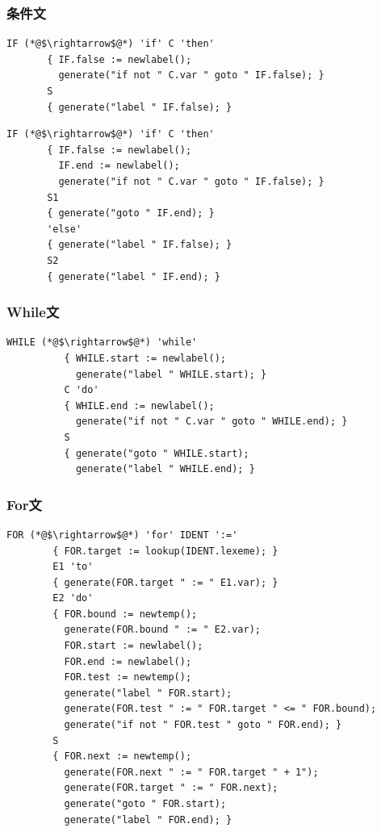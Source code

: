 \documentclass[dvipdfmx,a4j]{jbook}
\begin{document}
\subsubsection{条件文}

\begin{lstlisting}
IF (*@$\rightarrow$@*) 'if' C 'then'
       { IF.false := newlabel();
         generate("if not " C.var " goto " IF.false); }
       S
       { generate("label " IF.false); }
\end{lstlisting}

\begin{lstlisting}
IF (*@$\rightarrow$@*) 'if' C 'then'
       { IF.false := newlabel();
         IF.end := newlabel();
         generate("if not " C.var " goto " IF.false); }
       S1
       { generate("goto " IF.end); }
       'else'
       { generate("label " IF.false); }
       S2
       { generate("label " IF.end); }
\end{lstlisting}

\subsubsection{While文}

\begin{lstlisting}
WHILE (*@$\rightarrow$@*) 'while'
          { WHILE.start := newlabel();
            generate("label " WHILE.start); }
          C 'do'
          { WHILE.end := newlabel();
            generate("if not " C.var " goto " WHILE.end); }
          S
          { generate("goto " WHILE.start);
            generate("label " WHILE.end); }
\end{lstlisting}

\subsubsection{For文}

\begin{lstlisting}
FOR (*@$\rightarrow$@*) 'for' IDENT ':='
        { FOR.target := lookup(IDENT.lexeme); }
        E1 'to'
        { generate(FOR.target " := " E1.var); }
        E2 'do'
        { FOR.bound := newtemp();
          generate(FOR.bound " := " E2.var);
          FOR.start := newlabel();
          FOR.end := newlabel();
          FOR.test := newtemp();
          generate("label " FOR.start);
          generate(FOR.test " := " FOR.target " <= " FOR.bound);
          generate("if not " FOR.test " goto " FOR.end); }
        S
        { FOR.next := newtemp();
          generate(FOR.next " := " FOR.target " + 1");
          generate(FOR.target " := " FOR.next);
          generate("goto " FOR.start);
          generate("label " FOR.end); }
\end{lstlisting}
\end{document}

